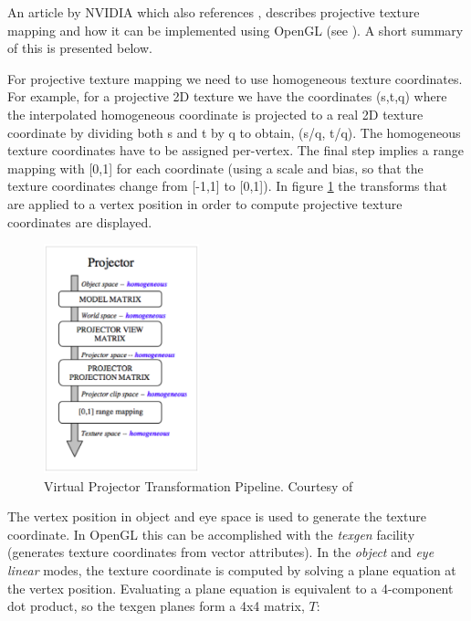 \documentclass[]{article}
\begin{document}
An article by NVIDIA which also references \cite{segal92}, describes projective texture mapping and how it can be implemented using OpenGL (see \cite{cassNvidia}). A short summary of this is presented below.

For projective texture mapping we need to use homogeneous texture coordinates. For example, for a projective 2D texture we have the coordinates (s,t,q) where the interpolated homogeneous coordinate is projected to a real 2D texture coordinate by dividing both s and t by q to obtain, (s/q, t/q). The homogeneous texture coordinates have to be assigned per-vertex. The final step implies a range mapping with [0,1] for each coordinate (using a scale and bias, so that the texture coordinates change from [-1,1] to [0,1]). In figure \ref{fig:VirtualProjectorPipeline} the transforms that are applied to a vertex position in order to compute projective texture coordinates are displayed.

\begin{figure}[hbtp]
    \centering
    \includegraphics[width=0.4\textwidth]{figures/VirtualProjectorPipeline.PNG}
    \caption{Virtual Projector Transformation Pipeline. Courtesy of \cite{cassNvidia}}
    \label{fig:VirtualProjectorPipeline}
\end{figure}

The vertex position in object and eye space is used to generate the texture coordinate. In OpenGL this can be accomplished with the \textit{texgen} facility (generates texture coordinates from vector attributes). In the \textit{object} and \textit{eye linear} modes, the texture coordinate is computed by solving a plane equation at the vertex position. Evaluating a plane equation is equivalent to a 4-component dot product, so the texgen planes form a 4x4 matrix, $T$:
\end{document}

